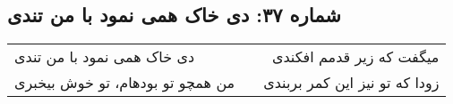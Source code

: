 \begin{center}
\section*{شماره ۳۷: دی خاک همی نمود با من تندی}
\label{sec:037}
\begin{longtable}{l p{0.5cm} r}
دی خاک همی نمود با من تندی
&&
میگفت که زیر قدمم افکندی
\\
من همچو تو بودهام، تو خوش بیخبری
&&
زودا که تو نیز این کمر بربندی
\\
\end{longtable}
\end{center}

